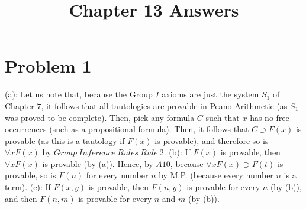 \documentclass{article}
\title{Chapter 13 Answers}
\theoremstyle{definition}
\begin{document}
\maketitle

\section*{Problem 1}
(a): Let us note that, because the Group $I$ axioms are just the system $S_1$ of Chapter $7$,
it follows that all tautologies are provable in Peano Arithmetic (as 
$S_1$ was proved to be complete). Then, pick any formula $C$ such that $x$ has no free occurrences (such as a propositional formula). Then, it follows 
that $C\supset F(x)$ is provable (as this is a tautology if $F(x)$ is provable), and therefore so is $\forall xF(x)$ by $Group\ Inference\ Rules\ Rule\ 2$.
\newline\newline 
(b): If $F(x)$ is provable, then $\forall xF(x)$ is provable (by (a)). Hence, by $A10$, because $\forall xF(x)\supset F(t)$ is provable, so is 
$F(\overline n)$ for every number $n$ by M.P. (because every number $n$ is a term).\newline\newline
(c): If $F(x,y)$ is provable, then $F(\overline n,y)$ is provable for every $n$ (by (b)), and then $F(\overline n, \overline m)$ is provable for every 
$n$ and $m$ (by (b)).
\end{document}
